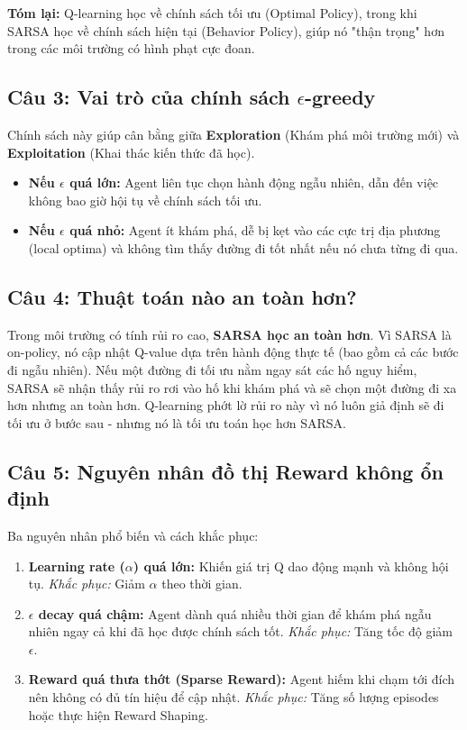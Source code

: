 \textbf{Tóm lại:} Q-learning học về chính sách tối ưu (Optimal Policy), trong khi SARSA học về chính sách hiện tại (Behavior Policy), giúp nó "thận trọng" hơn trong các môi trường có hình phạt cực đoan.

\subsection{Câu 3: Vai trò của chính sách $\epsilon$-greedy}
Chính sách này giúp cân bằng giữa \textbf{Exploration} (Khám phá môi trường mới) và \textbf{Exploitation} (Khai thác kiến thức đã học).
\begin{itemize}
    \item \textbf{Nếu $\epsilon$ quá lớn:} Agent liên tục chọn hành động ngẫu nhiên, dẫn đến việc không bao giờ hội tụ về chính sách tối ưu.
    \item \textbf{Nếu $\epsilon$ quá nhỏ:} Agent ít khám phá, dễ bị kẹt vào các cực trị địa phương (local optima) và không tìm thấy đường đi tốt nhất nếu nó chưa từng đi qua.
\end{itemize}

\subsection{Câu 4: Thuật toán nào an toàn hơn?}
Trong môi trường có tính rủi ro cao, \textbf{SARSA học an toàn hơn}. Vì SARSA là on-policy, nó cập nhật Q-value dựa trên hành động thực tế (bao gồm cả các bước đi ngẫu nhiên). Nếu một đường đi tối ưu nằm ngay sát các hố nguy hiểm, SARSA sẽ nhận thấy rủi ro rơi vào hố khi khám phá và sẽ chọn một đường đi xa hơn nhưng an toàn hơn. Q-learning phớt lờ rủi ro này vì nó luôn giả định sẽ đi tối ưu ở bước sau - nhưng nó là tối ưu toán học hơn SARSA.

\subsection{Câu 5: Nguyên nhân đồ thị Reward không ổn định}
Ba nguyên nhân phổ biến và cách khắc phục:
\begin{enumerate}
    \item \textbf{Learning rate ($\alpha$) quá lớn:} Khiến giá trị Q dao động mạnh và không hội tụ. \textit{Khắc phục:} Giảm $\alpha$ theo thời gian.
    \item \textbf{$\epsilon$ decay quá chậm:} Agent dành quá nhiều thời gian để khám phá ngẫu nhiên ngay cả khi đã học được chính sách tốt. \textit{Khắc phục:} Tăng tốc độ giảm $\epsilon$.
    \item \textbf{Reward quá thưa thớt (Sparse Reward):} Agent hiếm khi chạm tới đích nên không có đủ tín hiệu để cập nhật. \textit{Khắc phục:} Tăng số lượng episodes hoặc thực hiện Reward Shaping.
\end{enumerate}
